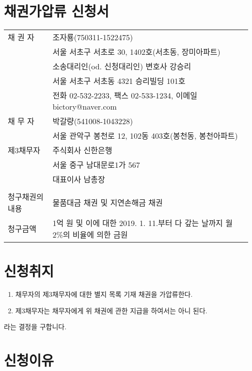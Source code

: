 \documentclass[12pt]{oblivoir}
\def\mysection#1{\hfil #1 \hfil} %
\begin{document}
\section*{\mysection{\Large 채권가압류 신청서}}
\vspace{5em}
{\raggedright
\begin{tabu} to 
  채 권 자&조자룡(750311-1522475)\\
  &서울 서초구 서초로 30, 1402호(서초동, 장미아파트)\\
  &소송대리인(od. 신청대리인) 변호사 강승리\\
  &서울 서초구 서초동 4321 승리빌딩 101호\\
  &전화 02-532-2233, 팩스 02-533-1234, 이메일 bictory@naver.com\\

채 무 자&박갈량(541008-1043228)\\
&서울 관악구 봉천로 12, 102동 403호(봉천동, 봉천아파트)\\

제3채무자&주식회사 신한은행\\
&서울 중구 남대문로1가 567\\
&대표이사 남총장\\
&\\
청구채권의 내용&물품대금 채권 및 지연손해금 채권\\
청구금액&1억 원 및 이에 대한 2019. 1. 11.부터 다 갚는 날까지 월 2\%의 비율에 의한 금원
\end{tabu}
}
\par
\vspace{5em}
\section*{\mysection{\large 신청취지}}
\vspace{1em}
\begin{enumerate}[nosep, left=0pt]
\item 채무자의 제3채무자에 대한 별지 목록 기재 채권을 가압류한다.
\item 제3채무자는 채무자에게 위 채권에 관한 지급을 하여서는 아니 된다.
\end{enumerate}
라는 결정을 구합니다.
\vspace{1em}
\section*{\mysection{\large 신청이유}}
\vspace{1em}
\end{document}
